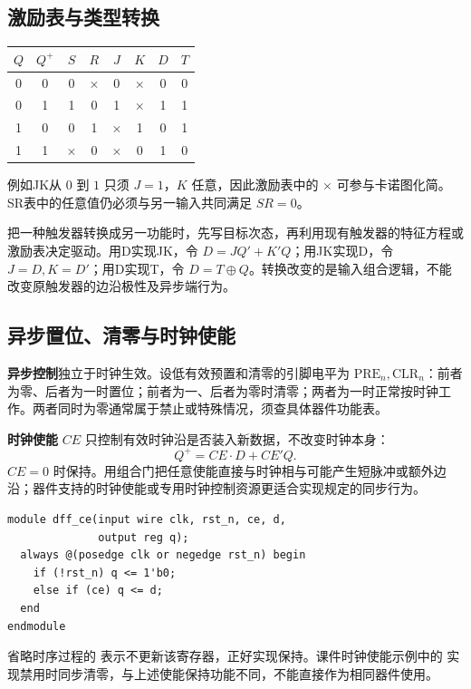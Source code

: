 \documentclass[UTF8,fontset=none,zihao=-4,a4paper]{ctexart}
\newcommand{\term}[1]{\textbf{#1}}
\newcommand{\code}[1]{\allowbreak{\small\texttt{\detokenize{#1}}}\allowbreak}
\begin{document}
\subsection{激励表与类型转换}
\begin{center}
\begin{tabular}{cc cc cc cc}
\toprule $Q$&$Q^+$&$S$&$R$&$J$&$K$&$D$&$T$\\\midrule
0&0&0&$\times$&0&$\times$&0&0\\
0&1&1&0&1&$\times$&1&1\\
1&0&0&1&$\times$&1&0&1\\
1&1&$\times$&0&$\times$&0&1&0\\\bottomrule
\end{tabular}
\end{center}
例如JK从 $0$ 到 $1$ 只须 $J=1$，$K$ 任意，因此激励表中的 $\times$ 可参与卡诺图化简。SR表中的任意值仍必须与另一输入共同满足 $SR=0$。

把一种触发器转换成另一功能时，先写目标次态，再利用现有触发器的特征方程或激励表决定驱动。用D实现JK，令 $D=JQ'+K'Q$；用JK实现D，令 $J=D,K=D'$；用D实现T，令 $D=T\oplus Q$。转换改变的是输入组合逻辑，不能改变原触发器的边沿极性及异步端行为。

\subsection{异步置位、清零与时钟使能}
\term{异步控制}独立于时钟生效。设低有效预置和清零的引脚电平为 $\mathrm{PRE}_n,\mathrm{CLR}_n$：前者为零、后者为一时置位；前者为一、后者为零时清零；两者为一时正常按时钟工作。两者同时为零通常属于禁止或特殊情况，须查具体器件功能表。

\term{时钟使能} $CE$ 只控制有效时钟沿是否装入新数据，不改变时钟本身：
\[
Q^+=CE\cdot D+CE'Q.
\]
$CE=0$ 时保持。用组合门把任意使能直接与时钟相与可能产生短脉冲或额外边沿；器件支持的时钟使能或专用时钟控制资源更适合实现规定的同步行为。
\par\noindent\begin{minipage}{\linewidth}
\begin{lstlisting}
module dff_ce(input wire clk, rst_n, ce, d,
              output reg q);
  always @(posedge clk or negedge rst_n) begin
    if (!rst_n) q <= 1'b0;
    else if (ce) q <= d;
  end
endmodule
\end{lstlisting}
\end{minipage}\par
省略时序过程的 \code{else} 表示不更新该寄存器，正好实现保持。课件时钟使能示例中的 \code{else Q <= 0;} 实现禁用时同步清零，与上述使能保持功能不同，不能直接作为相同器件使用。
\end{document}
